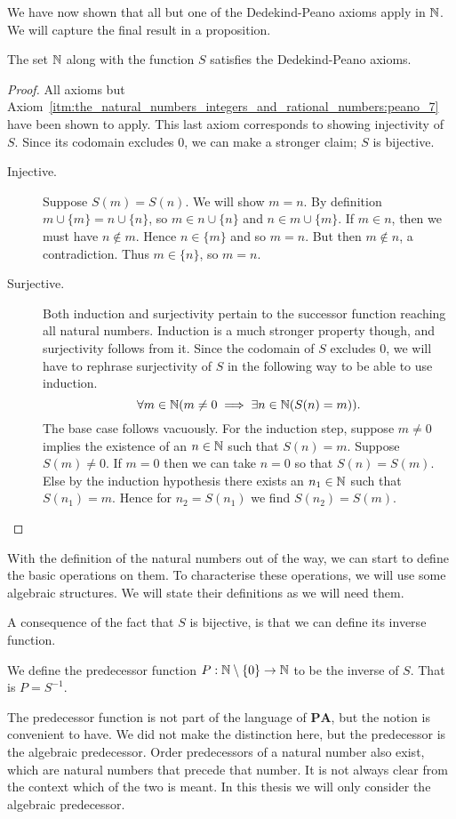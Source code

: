 \documentclass[../main.tex]{subfiles}
\begin{document}
We have now shown that all but one of the Dedekind-Peano axioms apply in $\mathbb{N}$. We will capture the final result in a proposition.
\begin{proposition}
    The set $\mathbb{N}$ along with the function $S$ satisfies the Dedekind-Peano axioms.
\end{proposition}
\begin{proof}
    All axioms but Axiom~\ref{itm:the_natural_numbers_integers_and_rational_numbers:peano_7} have been shown to apply. This last axiom corresponds to showing injectivity of $S$. Since its codomain excludes $0$, we can make a stronger claim; $S$ is bijective.
    \begin{description}
        \item[Injective.] Suppose $S(m)=S(n)$. We will show $m=n$. By definition $m\cup\{m\}=n\cup\{n\}$, so $m\in n\cup\{n\}$ and $n\in m\cup\{m\}$. If $m\in n$, then we must have $n\notin m$. Hence $n\in\{m\}$ and so $m=n$. But then $m\notin n$, a contradiction. Thus $m\in\{n\}$, so $m=n$.
        \item[Surjective.] Both induction and surjectivity pertain to the successor function reaching all natural numbers. Induction is a much stronger property though, and surjectivity follows from it. Since the codomain of $S$ excludes $0$, we will have to rephrase surjectivity of $S$ in the following way to be able to use induction.
        \begin{equation*}
            \forall m\in\mathbb{N}(m\neq0\implies\exists n\in\mathbb{N}(S(n)=m)).
        \end{equation*}
        The base case follows vacuously. For the induction step, suppose $m\neq0$ implies the existence of an $n\in\mathbb{N}$ such that $S(n)=m$. Suppose $S(m)\neq0$. If $m=0$ then we can take $n=0$ so that $S(n)=S(m)$. Else by the induction hypothesis there exists an $n_1\in\mathbb{N}$ such that $S(n_1)=m$. Hence for $n_2=S(n_1)$ we find $S(n_2)=S(m)$.
    \end{description}
\end{proof}

With the definition of the natural numbers out of the way, we can start to define the basic operations on them. To characterise these operations, we will use some algebraic structures. We will state their definitions as we will need them.

A consequence of the fact that $S$ is bijective, is that we can define its inverse function.
\begin{definition}\label{dfn:the_natural_numbers_integers_and_rational_numbers:predecessor_function}
    We define the predecessor function $P:\mathbb{N}\setminus\{0\}\to\mathbb{N}$ to be the inverse of $S$. That is $P=S^{-1}$.
\end{definition}
The predecessor function is not part of the language of $\mathbf{PA}$, but the notion is convenient to have. We did not make the distinction here, but the predecessor is the algebraic predecessor. Order predecessors of a natural number also exist, which are natural numbers that precede that number. It is not always clear from the context which of the two is meant. In this thesis we will only consider the algebraic predecessor.
\end{document}
